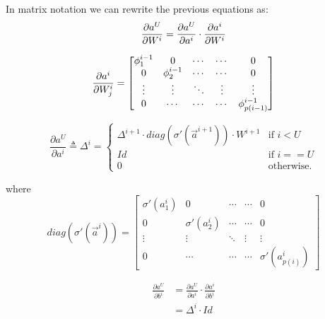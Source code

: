 In matrix notation we can rewrite the previous equations as:
\begin{equation}
 \frac{\partial a^U}{\partial W^i} = \frac{\partial a^U}{\partial a^{i}} \cdot \frac{\partial a^{i}}{\partial W^i}
\end{equation}


\begin{equation}
\frac{\partial a^{i}}{\partial W_j^i} =
 \begin{bmatrix}
   \phi_1^{i-1}    & 0                & \cdots      & \cdots       & 0  \\
   0               & \phi_2^{i-1}     & \cdots      & \cdots       & 0  \\
   \vdots          & \vdots           & \ddots      & \vdots       &\vdots\\
   0               & \cdots           & \cdots      & \cdots       & \phi^{i-1}_{p(i-1)}
\end{bmatrix}
\end{equation}

\begin{equation}
\frac{\partial a^U}{\partial a^{i}} \triangleq \Delta^{i} = 
\begin{cases}
      \Delta^{i+1} \cdot diag(\sigma'(\vec{a}^{i+1})) \cdot W^{i+1}  & \text{if } i<U\\
      Id & \text{if } i==U\\
    0 & \text{otherwise}.
\end{cases}
\end{equation}

where
\begin{equation}
diag(\sigma'(\vec{a}^{i})) =
 \begin{bmatrix}
   \sigma'(a^{i}_1)    & 0                & \cdots      & \cdots       & 0  \\
   0                     & \sigma'(a^{i}_2)     & \cdots      & \cdots       & 0  \\
   \vdots                & \vdots           & \ddots      & \vdots       &\vdots\\
   0                     & \cdots           & \cdots      & \cdots       &\sigma'(a^{i}_{p(i)})
\end{bmatrix}
\end{equation}

\begin{align}
\frac{\partial a^U}{\partial b^i} &= \frac{\partial a^U}{\partial a^i} \cdot \frac{\partial a^i}{\partial b^i}\\
&= \Delta^{i} \cdot Id
\end{align}
